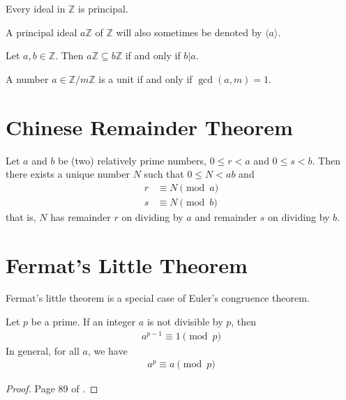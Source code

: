\documentclass[a4paper, 12pt]{book} %
\begin{document}
\begin{proposition}
    Every ideal in $\mathbb{Z}$ is principal.
\end{proposition}

A principal ideal $a\mathbb{Z}$ of $\mathbb{Z}$ will also sometimes be denoted by $\langle a\rangle$.

\begin{proposition}
    Let $a, b \in \mathbb{Z}$. Then $a \mathbb{Z} \subseteq b \mathbb{Z}$ if and only if $b|a$.
\end{proposition}


\begin{proposition}
    A number $a \in \mathbb{Z}/m\mathbb{Z}$ is a unit if and only if $\gcd(a,m)= 1$.
\end{proposition}

\section{Chinese Remainder Theorem}

\begin{theorem}
    Let $a$ and $b$ be (two) relatively prime numbers, $0 \leq r < a$ and $0 \leq s < b$. Then there exists a unique number $N$ such that $0 \leq N < ab$ and 
    \begin{align}
        r &\equiv N \pmod a \\
        s &\equiv N \pmod b
    \end{align}
    that is, $N$ has remainder $r$ on dividing by $a$ and remainder $s$ on dividing by $b$.
\end{theorem}


\section{Fermat's Little Theorem}


Fermat's little theorem is a special case of Euler's congruence theorem.
\begin{theorem}
    Let $p$ be a prime. If an integer $a$ is not divisible by $p$, then 
    \begin{align}
        a^{p-1} \equiv 1 \pmod p
    \end{align}
    In general, for all $a$, we have
    \begin{align}
        a^p \equiv a \pmod p
    \end{align} 
\end{theorem}
\begin{proof}
Page 89 of \cite{rubinstein2018cryptography}.
\end{proof}
\end{document}
